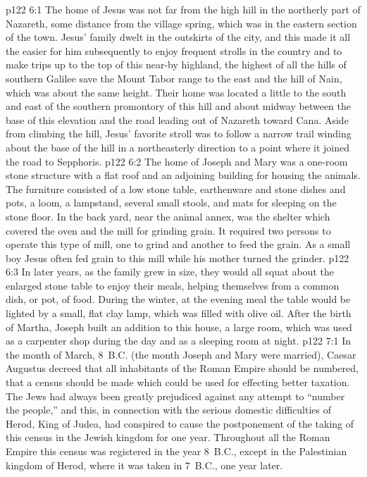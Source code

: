 \vs p122 6:1 The home of Jesus was not far from the high hill in the northerly part of Nazareth, some distance from the village spring, which was in the eastern section of the town. Jesus’ family dwelt in the outskirts of the city, and this made it all the easier for him subsequently to enjoy frequent strolls in the country and to make trips up to the top of this near\hyp{}by highland, the highest of all the hills of southern Galilee save the Mount Tabor range to the east and the hill of Nain, which was about the same height. Their home was located a little to the south and east of the southern promontory of this hill and about midway between the base of this elevation and the road leading out of Nazareth toward Cana. Aside from climbing the hill, Jesus’ favorite stroll was to follow a narrow trail winding about the base of the hill in a northeasterly direction to a point where it joined the road to Sepphoris.\plusone
\vs p122 6:2 The home of Joseph and Mary was a one\hyp{}room stone structure with a flat roof and an adjoining building for housing the animals. The furniture consisted of a low stone table, earthenware and stone dishes and pots, a loom, a lampstand, several small stools, and mats for sleeping on the stone floor. In the back yard, near the animal annex, was the shelter which covered the oven and the mill for grinding grain. It required two persons to operate this type of mill, one to grind and another to feed the grain. As a small boy Jesus often fed grain to this mill while his mother turned the grinder.
\vs p122 6:3 In later years, as the family grew in size, they would all squat about the enlarged stone table to enjoy their meals, helping themselves from a common dish, or pot, of food. During the winter, at the evening meal the table would be lighted by a small, flat clay lamp, which was filled with olive oil. After the birth of Martha, Joseph built an addition to this house, a large room, which was used as a carpenter shop during the day and as a sleeping room at night.
\vs p122 7:1 In the month of March, 8~B.C. (the month Joseph and Mary were married), Caesar Augustus decreed that all inhabitants of the Roman Empire should be numbered, that a census should be made which could be used for effecting better taxation. The Jews had always been greatly prejudiced against any attempt to “number the people,” and this, in connection with the serious domestic difficulties of Herod, King of Judea, had conspired to cause the postponement of the taking of this census in the Jewish kingdom for one year. Throughout all the Roman Empire this census was registered in the year 8~B.C., except in the Palestinian kingdom of Herod, where it was taken in 7~B.C., one year later.\plusone
